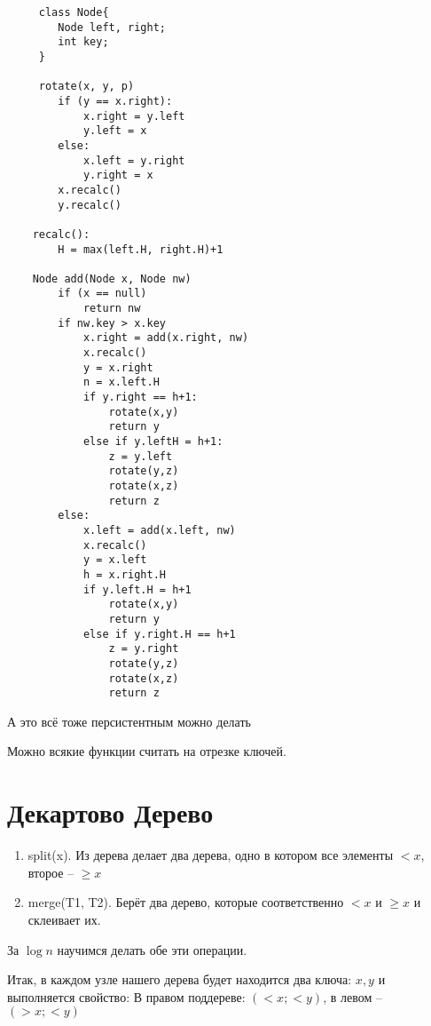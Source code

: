 \documentclass{book}
\theoremstyle{definition}
\begin{document}
 \begin{lstlisting}
     class Node{
        Node left, right;
        int key;
     }

     rotate(x, y, p) 
        if (y == x.right):
            x.right = y.left
            y.left = x
        else:
            x.left = y.right
            y.right = x
        x.recalc()
        y.recalc()

    recalc():
        H = max(left.H, right.H)+1

    Node add(Node x, Node nw)
        if (x == null)
            return nw
        if nw.key > x.key
            x.right = add(x.right, nw)
            x.recalc()
            y = x.right
            n = x.left.H
            if y.right == h+1:
                rotate(x,y)
                return y
            else if y.leftH = h+1:
                z = y.left
                rotate(y,z)
                rotate(x,z)
                return z
        else:
            x.left = add(x.left, nw)
            x.recalc()
            y = x.left
            h = x.right.H
            if y.left.H = h+1
                rotate(x,y)
                return y
            else if y.right.H == h+1
                z = y.right
                rotate(y,z)
                rotate(x,z)
                return z

 \end{lstlisting}
\begin{statement}
    А это всё тоже персистентным можно делать

    Можно всякие функции считать на отрезке ключей.
\end{statement}

\section{Декартово Дерево}

\begin{enumerate}
    \item split(x). Из дерева делает два дерева, одно в котором все элементы $<x$, второе --  $\geqslant x$
    \item merge(T1, T2). Берёт два дерево, которые соответственно $<x$ и  $\geqslant x$ и склеивает их. 
\end{enumerate}

За $\log n$ научимся делать обе эти операции.

Итак, в каждом узле нашего дерева будет находится два ключа: $x, y$ и выполняется свойство: 
В правом поддереве:  $\left( <x; <y \right) $, в левом -- $\left( >x; < y \right) $
\end{document}

